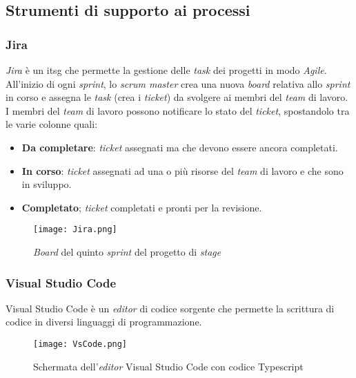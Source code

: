 \subsection{Strumenti di supporto ai processi}
\subsubsection{Jira}
\textit{Jira} è un \gls{itsg} che permette la gestione delle \textit{task} dei progetti in modo \textit{Agile}. All'inizio di ogni \textit{sprint}, lo \textit{scrum master} crea una nuova \textit{board} relativa allo \textit{sprint} in corso e assegna le \textit{task} (crea i \textit{ticket}) da svolgere ai membri del \textit{team} di lavoro.
I membri del \textit{team} di lavoro possono notificare lo stato del \textit{ticket}, spostandolo tra le varie colonne quali: 
\begin{itemize}
    \item \textbf{Da completare}: \textit{ticket} assegnati ma che devono essere ancora completati.
    \item \textbf{In corso}: \textit{ticket} assegnati ad una o più risorse del \textit{team} di lavoro e che sono in sviluppo.
    \item \textbf{Completato}; \textit{ticket} completati e pronti per la revisione.
\end{itemize}
\begin{figure}[H]
    \centering
    \texttt{[image: Jira.png]}
    \caption{\textit{Board} del quinto \textit{sprint} del progetto di \textit{stage}}
    \label{fig:Jira}
\end{figure}
\subsubsection{Visual Studio Code}
Visual Studio Code è un \textit{editor} di codice sorgente che permette la scrittura di codice in diversi linguaggi di programmazione.
\begin{figure}[H]
    \centering
    \texttt{[image: VsCode.png]}
    \caption{Schermata dell'\textit{editor} Visual Studio Code con codice Typescript}
    \label{fig:VsCode}
\end{figure}
